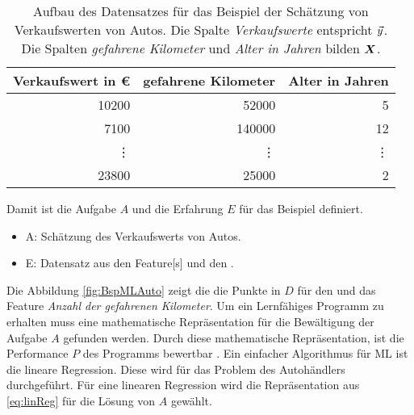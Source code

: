 \begin{table}
    \centering
    \begin{tabular}{|r|r|r|}
     \hline
        Verkaufswert in €   & gefahrene Kilometer   & Alter in Jahren\\
     \hline
        10200               & 52000                 & 5             \\
     \hline
        7100                & 140000                & 12            \\
     \hline
        \vdots              & \vdots                & \vdots        \\
     \hline
         23800              & 25000                 & 2             \\
      \hline
    \end{tabular}
    \caption{Aufbau des Datensatzes für das Beispiel der Schätzung von Verkaufswerten von Autos. Die Spalte \textit{Verkaufswerte} entspricht \(\vec{y}\). Die Spalten \textit{gefahrene Kilometer} und \textit{Alter in Jahren} bilden \(\boldsymbol{X}\). }
    \label{tab:BspMLAuto}
\end{table}

Damit ist die Aufgabe \(A\) und die Erfahrung \(E\) für das Beispiel definiert. 

\begin{itemize}
    \item A: Schätzung des Verkaufswerts von Autos.
    \item E: Datensatz aus den \gls{Feature}[s] und den .
\end{itemize}


Die Abbildung \ref{fig:BspMLAuto} zeigt die die Punkte in \(D\) für den  und das \gls{Feature} \textit{Anzahl der gefahrenen Kilometer}. Um ein Lernfähiges Programm zu erhalten muss eine mathematische Repräsentation für die Bewältigung der Aufgabe \(A\) gefunden werden. Durch diese mathematische Repräsentation, ist die Performance \(P\) des Programms bewertbar \cite{Mitchell.1997}. Ein einfacher Algorithmus für \gls{ML} ist die lineare Regression. Diese wird für das Problem des Autohändlers durchgeführt. Für eine linearen Regression wird die Repräsentation aus \ref{eq:linReg} für die Lösung von \(A\) gewählt.

